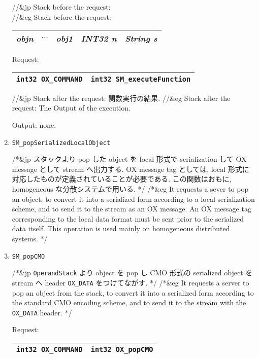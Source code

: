 \begin{enumerate}
//&jp Stack before the request: \\
//&eg Stack before the request: \\
\begin{tabular}{|c|c|c|c|c|}  \hline
{\it objn} & $\cdots$ & {\it obj1} & {\it INT32 n} & {\it String s} \\
\hline 
\end{tabular}

Request:
\begin{tabular}{|c|c|}  \hline
{\tt int32 OX\_COMMAND} & {\tt int32 SM\_executeFunction}  \\
\hline
\end{tabular}

//&jp Stack after the request: 関数実行の結果.
//&eg Stack after the request: The Output of the execution.

Output: none.

\item
\begin{verbatim}
SM_popSerializedLocalObject
\end{verbatim}

/*&jp
スタックより pop した object を local 形式で serialization して
OX message として stream へ出力する. OX message tag としては, 
local 形式に対応したものが定義されていることが必要である. 
この関数はおもに, homogeneous な分散システムで用いる.
*/
/*&eg
It requests a sever to pop an object, to convert it into a
serialized form according to a local serialization scheme, and
to send it to the stream as an OX message. 
An OX message tag corresponding to
the local data format must be sent prior to the serialized data
itself.
This operation is used mainly on homogeneous distributed systems.
*/

\item
\begin{verbatim}
SM_popCMO
\end{verbatim}

/*&jp
{\tt OperandStack} より object を pop し CMO 形式の serialized object を 
stream へ header {\tt OX\_DATA} をつけてながす. 
*/
/*&eg
It requests a server to pop an object from the stack, to convert
it into a serialized form according to the standard CMO encoding scheme,
and to send it to the stream with the {\tt OX\_DATA} header.
*/

Request:
\begin{tabular}{|c|c|}  \hline
{\tt int32 OX\_COMMAND} & {\tt int32 OX\_popCMO}  \\
\hline 
\end{tabular}


\end{enumerate}
